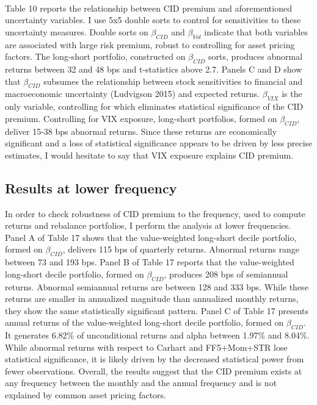 \documentclass[12pt]{article}
\begin{document}
\paragraph{}
Table 10 reports the relationship between CID premium and aforementioned uncertainty variables. I use 5x5 double sorts to control for sensitivities to these uncertainty measures. Double sorts on $\beta_{CID}$ and $\beta_{Vol}$ indicate that both variables are associated with large risk premium, robust to controlling for asset pricing factors. The long-short portfolio, constructed on $\beta_{CID}$ sorts, produces abnormal returns between 32 and 48 bps and t-statistics above 2.7. Panels C and D show that $\beta_{CID}$ subsumes the relationship between stock sensitivities to financial and macroeconomic uncertainty (Ludvigson 2015) and expected returns. 
$\beta_{VIX}$ is the only variable, controlling for which eliminates statistical significance of the CID premium. Controlling for VIX exposure, long-short portfolios, formed on $\beta_{CID}$, deliver 15-38 bps abnormal returns. Since these returns are economically significant and a loss of statistical significance appears to be driven by less precise estimates, I would hesitate to say that VIX exposure explains CID premium.

\subsection{Results at lower frequency}

In order to check robustness of CID premium to the frequency, used to compute returns and rebalance portfolios, I perform the analysis at lower frequencies.
Panel A of Table 17 shows that the value-weighted long-short decile portfolio, formed on $\beta_{CID}$, delivers 115 bps of quarterly returns. Abnormal returns range between 73 and 193 bps. Panel B of Table 17 reports that the value-weighted long-short decile portfolio, formed on $\beta_{CID}$, produces 208 bps of semiannual returns. Abnormal semiannual returns are between 128 and 333 bps. While these returns are smaller in annualized magnitude than annualized monthly returns, they show the same statistically significant pattern. Panel C of Table 17 presents annual returns of the value-weighted long-short decile portfolio, formed on $\beta_{CID}$. It generates 6.82\% of unconditional returns and alpha between 1.97\% and 8.04\%. While abnormal returns with respect to Carhart and FF5+Mom+STR lose statistical significance, it is likely driven by the decreased statistical power from fewer observations. Overall, the results suggest that the CID premium exists at any frequency between the monthly and the annual frequency and is not explained by common asset pricing factors.
\end{document}
